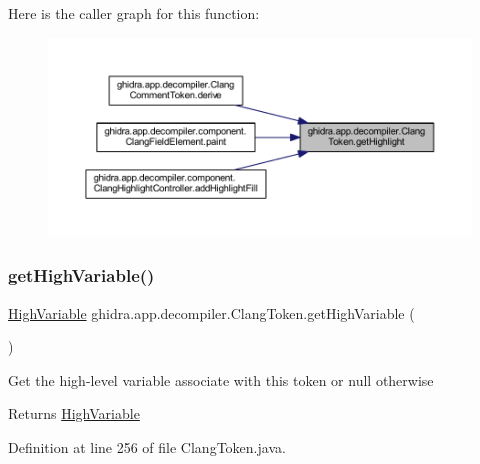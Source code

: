 Here is the caller graph for this function\+:
\nopagebreak
\begin{figure}[H]
\begin{center}
\leavevmode
\includegraphics[width=350pt]{classghidra_1_1app_1_1decompiler_1_1_clang_token_a9732960b1a55039d9230bf14081cc8bc_icgraph}
\end{center}
\end{figure}
\mbox{\label{classghidra_1_1app_1_1decompiler_1_1_clang_token_ac435f687ea1b950f859e66445763e413}} 
\subsubsection{\texorpdfstring{getHighVariable()}{getHighVariable()}}
{\footnotesize\ttfamily \mbox{\hyperlink{class_high_variable}{High\+Variable}} ghidra.\+app.\+decompiler.\+Clang\+Token.\+get\+High\+Variable (\begin{DoxyParamCaption}{ }\end{DoxyParamCaption})\hspace{0.3cm}{\ttfamily [inline]}}

Get the high-\/level variable associate with this token or null otherwise \begin{DoxyReturn}{Returns}
\mbox{\hyperlink{class_high_variable}{High\+Variable}} 
\end{DoxyReturn}


Definition at line 256 of file Clang\+Token.\+java.

